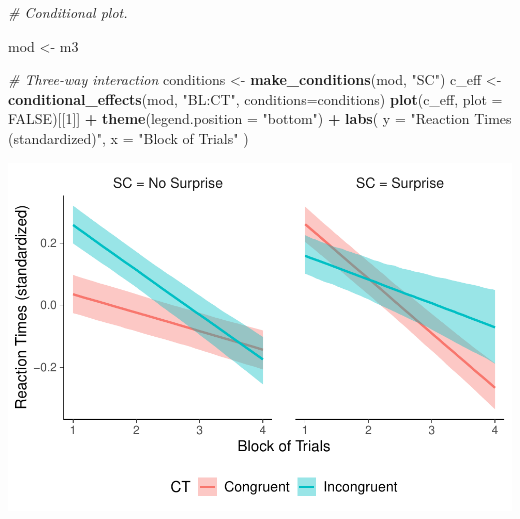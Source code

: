 \documentclass[
]{article}
\newenvironment{Shaded}{\begin{snugshade}}{\end{snugshade}}
\newcommand{\AttributeTok}[1]{\textcolor[rgb]{0.13,0.29,0.53}{#1}}
\newcommand{\CommentTok}[1]{\textcolor[rgb]{0.56,0.35,0.01}{\textit{#1}}}
\newcommand{\ConstantTok}[1]{\textcolor[rgb]{0.56,0.35,0.01}{#1}}
\newcommand{\DecValTok}[1]{\textcolor[rgb]{0.00,0.00,0.81}{#1}}
\newcommand{\FunctionTok}[1]{\textcolor[rgb]{0.13,0.29,0.53}{\textbf{#1}}}
\newcommand{\NormalTok}[1]{#1}
\newcommand{\OtherTok}[1]{\textcolor[rgb]{0.56,0.35,0.01}{#1}}
\newcommand{\SpecialCharTok}[1]{\textcolor[rgb]{0.81,0.36,0.00}{\textbf{#1}}}
\newcommand{\StringTok}[1]{\textcolor[rgb]{0.31,0.60,0.02}{#1}}
\begin{document}
\begin{Shaded}
\begin{Highlighting}[]
\CommentTok{\# Conditional plot.}

\NormalTok{mod }\OtherTok{\textless{}{-}}\NormalTok{ m3}

\CommentTok{\# Three{-}way interaction}
\NormalTok{conditions }\OtherTok{\textless{}{-}} \FunctionTok{make\_conditions}\NormalTok{(mod, }\StringTok{"SC"}\NormalTok{)}
\NormalTok{c\_eff }\OtherTok{\textless{}{-}} \FunctionTok{conditional\_effects}\NormalTok{(mod, }\StringTok{"BL:CT"}\NormalTok{, }\AttributeTok{conditions=}\NormalTok{conditions) }
\FunctionTok{plot}\NormalTok{(c\_eff, }\AttributeTok{plot =} \ConstantTok{FALSE}\NormalTok{)[[}\DecValTok{1}\NormalTok{]] }\SpecialCharTok{+}
  \FunctionTok{theme}\NormalTok{(}\AttributeTok{legend.position =} \StringTok{"bottom"}\NormalTok{) }\SpecialCharTok{+}
  \FunctionTok{labs}\NormalTok{(}
    \AttributeTok{y =} \StringTok{"Reaction Times (standardized)"}\NormalTok{,}
    \AttributeTok{x =} \StringTok{"Block of Trials"}
\NormalTok{  )}
\end{Highlighting}
\end{Shaded}

\includegraphics{20_variational_inference_files/figure-latex/unnamed-chunk-16-1.pdf}

\begin{Shaded}
\end{Shaded}
\end{document}
